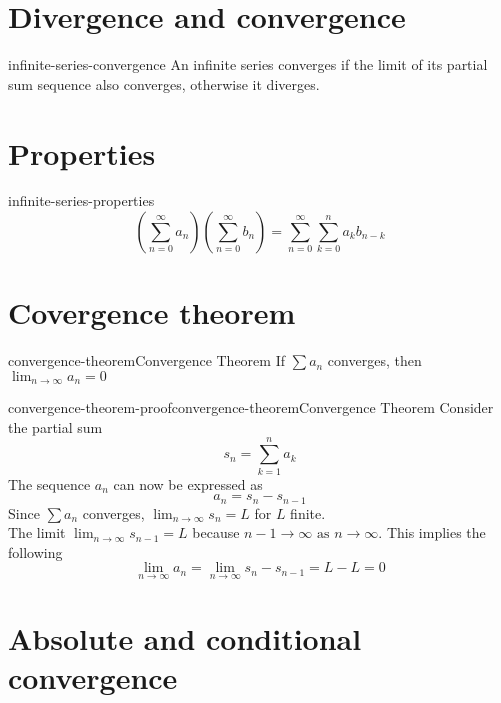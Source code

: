\documentclass[preview]{standalone}
\begin{document}
\genpage

\section{Divergence and convergence}

\begin{snippet}{infinite-series-convergence}
    An infinite series converges if the limit
    of its partial sum sequence also converges,
    otherwise it diverges.
\end{snippet}

\section{Properties}

\begin{snippettheorem}{infinite-series-properties}{}
    \[
        \left(
            \sum_{n=0}^\infty a_n
        \right)
        \left(
            \sum_{n=0}^\infty b_n
        \right)
        =
        \sum_{n=0}^\infty \sum_{k=0}^n a_k b_{n-k}
    \]
\end{snippettheorem}

\section{Covergence theorem}

\begin{snippettheorem}{convergence-theorem}{Convergence Theorem}
    If \(\sum a_n\) converges, then \(\lim_{n\to\infty}a_n=0\)
\end{snippettheorem}

\begin{snippetproof}{convergence-theorem-proof}{convergence-theorem}{Convergence Theorem}
    Consider the partial sum
    \[
        s_n = \sum_{k=1}^{n}a_k
    \]
    The sequence \(a_n\) can now be expressed as
    \[
        a_n = s_n - s_{n-1}
    \]
    Since \(\sum a_n\) converges, \(\lim_{n\to\infty}s_n=L\) for \(L\) finite. \\
    The limit \(\lim_{n\to\infty}s_{n-1}=L\) because \(n-1 \to \infty \text{ as } n \to \infty\).
    This implies the following
    \[
        \lim_{n \to \infty} a_n
        = \lim_{n \to \infty} s_n - s_{n-1} = L - L = 0
    \]
\end{snippetproof}

\section{Absolute and conditional convergence}
\end{document}

